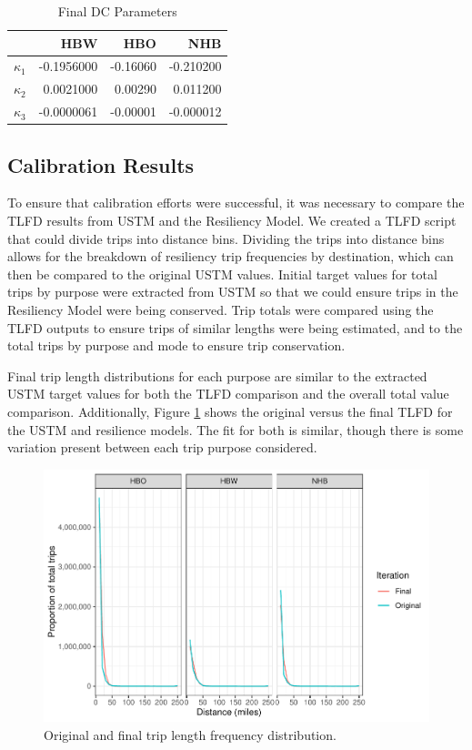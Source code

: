 \begin{table}

\caption{\label{tab:finaldc}Final DC Parameters}
\centering
\begin{tabular}[t]{lrrr}
\toprule
 & HBW & HBO & NHB\\
\midrule
$\kappa_1$ & -0.1956000 & -0.16060 & -0.210200\\
$\kappa_2$ & 0.0021000 & 0.00290 & 0.011200\\
$\kappa_3$ & -0.0000061 & -0.00001 & -0.000012\\
\bottomrule
\end{tabular}
\end{table}

\subsection{Calibration Results}

To ensure that calibration efforts were successful, it was necessary to
compare the TLFD results from USTM and the Resiliency Model. We created a
TLFD script that could divide trips
into distance bins. Dividing the trips into distance bins allows for the
breakdown of resiliency trip frequencies by destination, which can then be
compared to the original USTM values. Initial target values for total
trips by purpose were extracted from USTM so that we could ensure trips in
the Resiliency Model were being conserved. Trip totals were compared using
the TLFD outputs to ensure trips of similar lengths were being estimated,
and to the total trips by purpose and mode to ensure trip conservation.

Final trip length distributions for each purpose are similar to the
extracted USTM target values for both the TLFD comparison and the overall
total value comparison. Additionally, Figure \ref{fig:ustm_tlfd} shows the original versus the final
TLFD for the USTM and resilience models. The fit for both is similar, though
there is some variation present between each trip purpose considered.

\begin{figure}

{\centering \includegraphics{figures/chapter3/TLFD.pdf}

}

\caption{Original and final trip length frequency distribution.}\label{fig:ustm_tlfd}
\end{figure}


